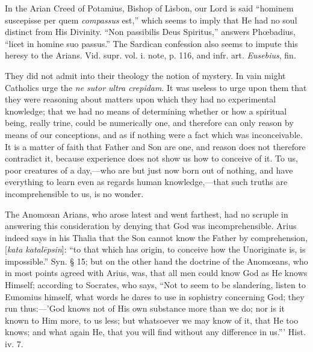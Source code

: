 In the Arian Creed of Potamius, Bishop of Lisbon,
our Lord is said ``hominem suscepisse per quem \emph{compassus} est,''
which seems to imply that He had no soul distinct from His Divinity. ``Non
passibilis Deus Spiritus,'' answers Phœbadius, ``licet in homine suo
passus.'' The Sardican confession also seems to impute this heresy to
the Arians. Vid. supr. vol. i. note, p. 116, and infr. art. \emph{Eusebius},
fin.

They did not admit into their theology the notion
of mystery. In vain might Catholics urge the \emph{ne sutor ultra
crepidam}. It was useless to urge upon them that they were
reasoning about matters upon which they had no experimental knowledge;
that we had no means of determining whether or how a spiritual being,
really trine, could be numerically one, and therefore can only reason
by means of our conceptions, and as if nothing were a fact which was
inconceivable. It is a matter of faith that Father and Son are one,
and reason does not therefore contradict it, because experience does
not show us how to conceive of it. To us, poor creatures of a
day,—who are but just now born out of nothing, and have everything
to learn even as regards human knowledge,—that such truths are
incomprehensible to us, is no wonder.

The Anomœan Arians, who arose latest and went
farthest, had no scruple in answering this consideration by denying
that God was incomprehensible. Arius indeed says in his Thalia that
the Son cannot know the Father by comprehension, [\emph{kata katal\={e}psin}]:
``to that which has origin, to conceive how the Unoriginate is, is
impossible.'' Syn. § 15; but on the other hand the doctrine of the
Anomœans, who in most points agreed with Arius, was, that all men
could know God as He knows Himself; according to Socrates, who says, ``Not
to seem to be slandering, listen to Eunomius himself, what words he
dares to use in sophistry concerning God; they run thus:—'God knows
not of His own substance more than we do; nor is it known to Him more,
to us less; but whatsoever we may know of it, that He too knows;
and what again He, that you will find without any difference in us.'''
Hist. iv. 7.

